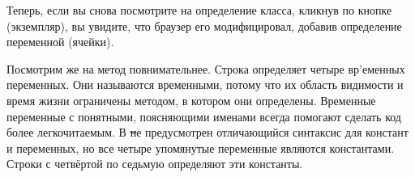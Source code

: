 \documentclass[a4paper,10pt,twoside]{book}
\begin{document}
{%
Теперь, если вы снова посмотрите на определение класса, кликнув по кнопке  (экземпляр), вы увидите, что браузер его модифицировал, добавив определение переменной  (ячейки).

Посмотрим же на метод  повнимательнее.
Строка  определяет четыре вр'еменных переменных. Они называются временными, потому что их область видимости и время жизни ограничены методом, в котором они определены. Временные переменные с понятными, поясняющими именами всегда помогают сделать код более легкочитаемым. В \st не предусмотрен отличающийся синтаксис для констант и переменных, но все четыре упомянутые переменные являются константами.
Строки с четвёртой по седьмую определяют эти константы.

}
\end{document}
